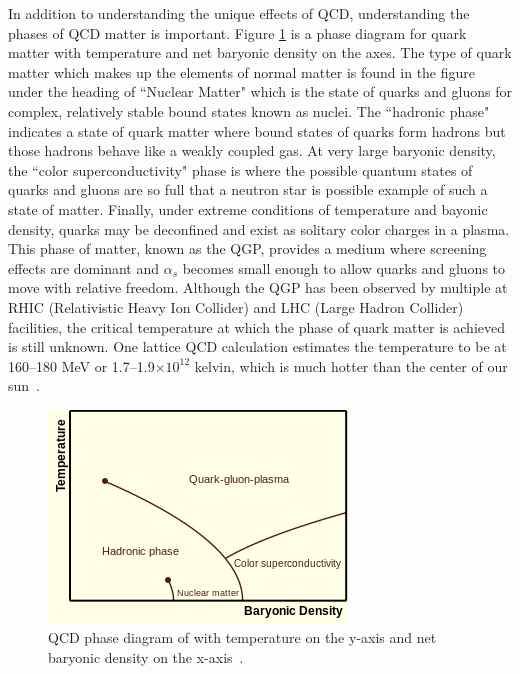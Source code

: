 In addition to understanding the unique effects of QCD, understanding the phases of QCD matter is important. Figure \ref{fig:qcd_phase} is a phase diagram for quark matter with temperature  and net baryonic density on the axes. The type of quark matter which makes up the elements of normal matter is found in the figure under the heading of ``Nuclear Matter" which is the state of quarks and gluons for complex, relatively stable bound states known as nuclei. The ``hadronic phase" indicates a state of quark matter where bound states of quarks form hadrons but those hadrons behave like a weakly coupled gas. At very large baryonic density, the ``color superconductivity" phase is where the possible quantum states of quarks and gluons are so full that a neutron star is possible example of such a state of matter. Finally, under extreme conditions of temperature and bayonic density, quarks may be deconfined and exist as solitary color charges in a plasma. This phase of matter, known as the QGP, provides a medium where screening effects are dominant and $\alpha_s$ becomes small enough to allow quarks and gluons to move with relative freedom. Although the QGP has been observed by multiple at RHIC (Relativistic Heavy Ion Collider) and LHC (Large Hadron Collider) facilities, the critical temperature at which the phase of quark matter is achieved is still unknown. One lattice QCD calculation estimates the temperature to be at 160--180 MeV or 1.7--1.9$\times10^{12}$ kelvin, which is much hotter than the center of our sun~\cite{SATZ20114}.

\begin{figure}[!ht]
\centering
\includegraphics[width=0.55\linewidth]{figs/qcd_phase_diagram.png}
\caption{QCD phase diagram of with temperature on the y-axis and net baryonic density on the x-axis~\cite{Bhalerao:2014owa}.}
\label{fig:qcd_phase}
\end{figure}

